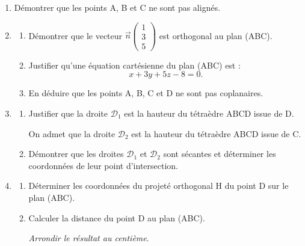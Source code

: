 \documentclass[10pt]{article}
\providecommand{\vect}[1]{\overrightarrow{#1}}
\begin{document}
\begin{enumerate}
\item Démontrer que les points A, B et C ne sont pas alignés.
\item 
	\begin{enumerate}
		\item Démontrer que le vecteur $\vect{n}\begin{pmatrix}1\\3\\5\end{pmatrix}$ est orthogonal au plan (ABC).
		\item  Justifier qu'une équation cartésienne du plan (ABC) est :
\[x + 3y + 5z - 8 = 0.\]

		\item En déduire que les points A, B, C et D ne sont pas coplanaires.
	\end{enumerate}
\item 
	\begin{enumerate}
		\item Justifier que la droite $\mathcal{D}_1$ est la hauteur du tétraèdre ABCD issue de D.

On admet que la droite $\mathcal{D}_2$ est la hauteur du tétraèdre ABCD issue de C.
		\item Démontrer que les droites $\mathcal{D}_1$ et $\mathcal{D}_2$ sont sécantes et déterminer les coordonnées de leur point d'intersection.
	\end{enumerate}
\item 
	\begin{enumerate}
		\item Déterminer les coordonnées du projeté orthogonal H du point D sur le plan (ABC). 
		\item Calculer la distance du point D au plan (ABC). 

\emph{Arrondir le résultat au centième}.
	\end{enumerate}
\end{enumerate}
\end{document}
